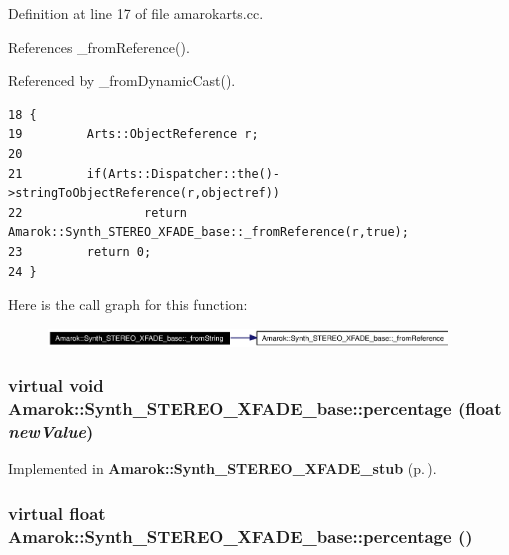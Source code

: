 Definition at line 17 of file amarokarts.cc.

References \_\-from\-Reference().

Referenced by \_\-from\-Dynamic\-Cast().



\footnotesize\begin{verbatim}18 {
19         Arts::ObjectReference r;
20 
21         if(Arts::Dispatcher::the()->stringToObjectReference(r,objectref))
22                 return Amarok::Synth_STEREO_XFADE_base::_fromReference(r,true);
23         return 0;
24 }
\end{verbatim}\normalsize 


Here is the call graph for this function:\begin{figure}[H]
\begin{center}
\leavevmode
\includegraphics[width=300pt]{classAmarok_1_1Synth__STEREO__XFADE__base_Amarok_1_1Synth__STEREO__XFADE__stube1_cgraph}
\end{center}
\end{figure}
\subsubsection{\setlength{\rightskip}{0pt plus 5cm}virtual void Amarok::Synth\_\-STEREO\_\-XFADE\_\-base::percentage (float {\em new\-Value})\hspace{0.3cm}{\tt  [pure virtual]}}\label{classAmarok_1_1Synth__STEREO__XFADE__base_Amarok_1_1Synth__STEREO__XFADE__skela10}




Implemented in {\bf Amarok::Synth\_\-STEREO\_\-XFADE\_\-stub} {\rm (p.\,\pageref{classAmarok_1_1Synth__STEREO__XFADE__stub_Amarok_1_1Synth__STEREO__XFADE__stuba2})}.
\subsubsection{\setlength{\rightskip}{0pt plus 5cm}virtual float Amarok::Synth\_\-STEREO\_\-XFADE\_\-base::percentage ()\hspace{0.3cm}{\tt  [pure virtual]}}\label{classAmarok_1_1Synth__STEREO__XFADE__base_Amarok_1_1Synth__STEREO__XFADE__skela9}




